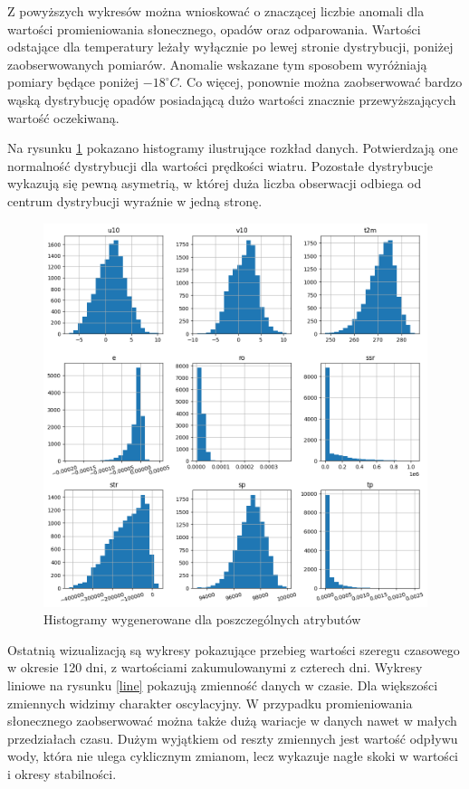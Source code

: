 Z powyższych wykresów można wnioskować o znaczącej liczbie anomali dla wartości promieniowania słonecznego,
opadów oraz odparowania. Wartości odstające dla temperatury leżały wyłącznie po lewej stronie dystrybucji,
poniżej zaobserwowanych pomiarów. Anomalie wskazane tym sposobem wyróżniają pomiary będące poniżej $-18^\circ C$. Co więcej, ponownie można zaobserwować bardzo wąską dystrybucję opadów posiadającą dużo wartości znacznie
przewyższających wartość oczekiwaną. 

Na rysunku \ref{hist} pokazano histogramy ilustrujące rozkład danych. Potwierdzają one normalność dystrybucji
dla wartości prędkości wiatru. Pozostałe dystrybucje wykazują się pewną asymetrią, w której duża liczba 
obserwacji odbiega od centrum dystrybucji wyraźnie w jedną stronę. 

\begin{figure}[H]
    \centering
    \includegraphics[width=\textwidth]{images/hist.png}
    \caption{Histogramy wygenerowane dla poszczególnych atrybutów}
    \label{hist}
\end{figure}

Ostatnią wizualizacją są wykresy pokazujące przebieg wartości szeregu czasowego w okresie 120 dni, z 
wartościami zakumulowanymi z czterech dni. Wykresy liniowe na rysunku \ref{line} pokazują zmienność
danych w czasie. Dla większości zmiennych widzimy charakter oscylacyjny. W przypadku promieniowania 
słonecznego zaobserwować można także dużą wariacje w danych nawet w małych przedziałach czasu. 
Dużym wyjątkiem od reszty zmiennych jest wartość odpływu wody, która nie ulega cyklicznym zmianom, lecz
wykazuje nagłe skoki w wartości i okresy stabilności.


